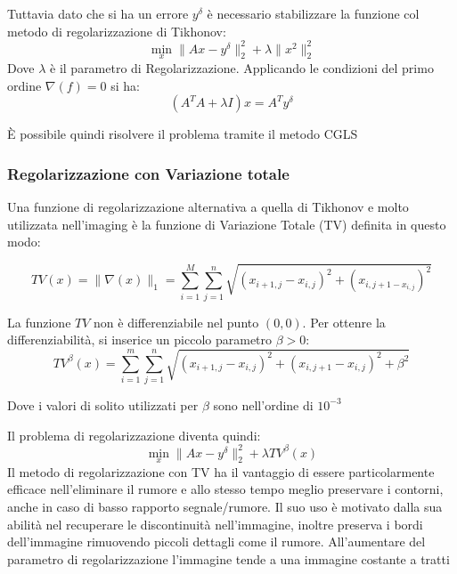 Tuttavia dato che si ha un errore $y^\delta$ è necessario stabilizzare la funzione col metodo di regolarizzazione di Tikhonov:
\[
    \min_x \|Ax-y^\delta\|_2^2 + \lambda\|x^2\|_2^2
\]
Dove $\lambda$ è il parametro di Regolarizzazione. Applicando le condizioni del primo ordine $\nabla (f) = 0$ si ha:
\[
    (A^T A + \lambda I)x = A^T y^\delta    
\]

È possibile quindi risolvere il problema tramite il metodo CGLS
\subsubsection{Regolarizzazione con Variazione totale}
Una funzione di regolarizzazione alternativa a quella di Tikhonov e molto utilizzata nell’imaging è la funzione di Variazione Totale (TV) definita in questo modo:

\[
    TV(x) = \|\nabla (x)\|_1 = \sum_{i=1}^{M}\sum_{j=1}^{n} \sqrt{(x_{i+1,j}- x_{i,j})^2 + (x_{i,j+1 - x_{i,j}})^2}    
\]

La funzione $TV$ non è differenziabile nel punto $(0,0)$. Per ottenre la differenziabilità, si inserice un piccolo parametro $\beta > 0$:
\[
    TV^\beta(x) = \sum_{i=1}^{m}\sum_{j=1}^{n} \sqrt{(x_{i+1,j}- x_{i,j})^2 + (x_{i,j+1} - x_{i,j})^2 + \beta^2}
\]

Dove i valori di solito utilizzati per $\beta$ sono nell'ordine di $10^{-3}$

Il problema di regolarizzazione diventa quindi:
\[
    \min_x \|Ax-y^\delta\|_2^2 + \lambda TV ^ \beta(x)    
\]
Il metodo di regolarizzazione con TV ha il vantaggio di essere particolarmente efficace nell’eliminare il rumore e allo stesso tempo meglio preservare i contorni, anche in caso di basso rapporto segnale/rumore. Il suo uso è motivato dalla sua abilità nel recuperare le discontinuità nell’immagine, inoltre preserva i bordi dell’immagine rimuovendo piccoli dettagli come il rumore.
All’aumentare del parametro di regolarizzazione l’immagine tende a una immagine costante a tratti


